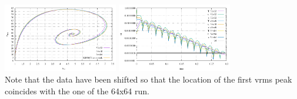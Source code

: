 \begin{center}
\includegraphics[width=5cm]{python_codes/fieldstone_03/results_1e4/Nu_vrms.pdf}
\includegraphics[width=5cm]{python_codes/fieldstone_03/results_1e4/convergence.pdf}\\
{\captionfont Note that the \aspect data have been shifted so that the location of the 
first vrms peak coincides with the one of the 64x64 run.}
\end{center}

\newpage
